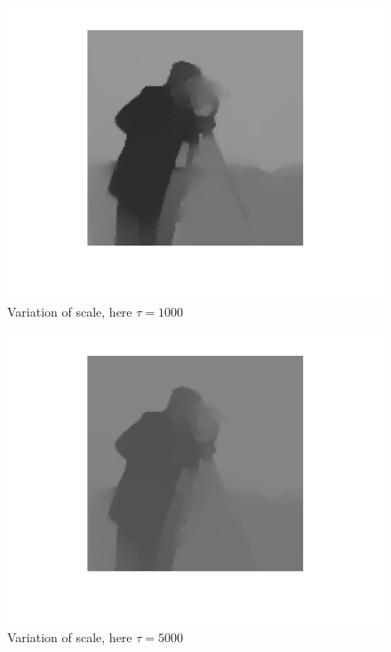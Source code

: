 \documentclass{report}
\begin{document}
\begin{figure}
	\centering
	\includegraphics[]{../out/report_taus09.png}
	\caption{Variation of scale, here $\tau = 1000$}
	\label{vis:taus09}
\end{figure}

\begin{figure}
	\centering
	\includegraphics[]{../out/report_taus10.png}
	\caption{Variation of scale, here $\tau = 5000$}
	\label{vis:taus10}
\end{figure}

\clearpage
\end{document}
